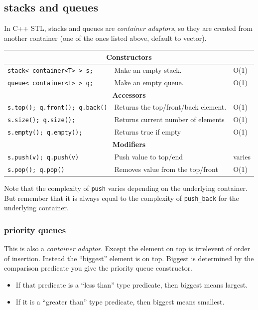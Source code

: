 \documentclass[12 pt, twoside] {article}
\begin{document}
{\subsection*{stacks and queues}
In C++ STL, stacks and queues are \textit{container adaptors}, so they are
created from another container (one of the ones listed above, default to
vector).
\begin{table}[h]
    \begin{tabular}{|l|l|l|}\hline
        \multicolumn{3}{|c|}{\textbf{Constructors}}\\\hline
        \texttt{stack< container<T> > s;} & Make an empty stack. & O(1)\\\hline
        \texttt{queue< container<T> > q;} & Make an empty queue. & O(1)\\\hline
        \multicolumn{3}{|c|}{\textbf{Accessors}}\\\hline
        \texttt{s.top(); q.front(); q.back()} & Returns the top/front/back element. & O(1) \\\hline
        \texttt{s.size(); q.size();} & Returns current number of elements & O(1) \\\hline
        \texttt{s.empty(); q.empty();} & Returns true if empty & O(1) \\\hline
        \multicolumn{3}{|c|}{\textbf{Modifiers}}\\\hline
        \texttt{s.push(v); q.push(v)} & Push value to top/end & varies \\\hline
        \texttt{s.pop(); q.pop()} & Removes value from the top/front & O(1) \\\hline
    \end{tabular}
\end{table}

Note that the complexity of \texttt{push} varies depending on the underlying
container. But remember that it is always equal to the complexity of
\texttt{push\_back} for the underlying container.

\subsubsection*{priority queues}

This is also a \textit{container adaptor}. Except the element on top is
irrelevent of order of insertion. Instead the ``biggest'' element is on top.
Biggest is determined by the comparison predicate you give the priority queue constructor.
\begin{itemize}
    \item If that predicate is a ``less than'' type predicate, then biggest means largest.
    \item If it is a ``greater than'' type predicate, then biggest means smallest.
\end{itemize}

}
\end{document}
